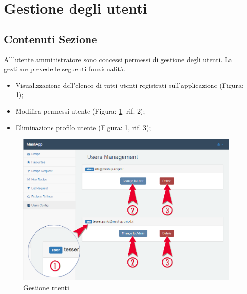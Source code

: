 %

\section{Gestione degli utenti} %
\label{sec:gestione_utenti}
	

	\subsection{Contenuti Sezione} %
	\label{sub:contenuti_sezione}
		All'utente amministratore sono concessi permessi di gestione degli utenti.
		La gestione prevede le seguenti funzionalità:
		\begin{itemize}
			\item Visualizzazione dell'elenco di tutti utenti registrati sull'applicazione (Figura: \ref{fig:configurazione_utenti});
			\item Modifica permessi utente (Figura: \ref{fig:configurazione_utenti}, rif. 2);
			\item Eliminazione profilo utente (Figura: \ref{fig:configurazione_utenti}, rif. 3);
		\end{itemize}
		\begin{figure}[H]
			\centering
			\centerline{\includegraphics[width=14cm]{images/configurazione_utenti.png}}
			\caption{Gestione utenti}
			\label{fig:configurazione_utenti}
		\end{figure}

